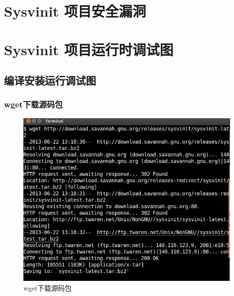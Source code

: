 \chapter{Sysvinit 项目安全漏洞}

\chapter{Sysvinit 项目运行时调试图}

\section{编译安装运行调试图}

\subsection{wget下载源码包}

\begin{figure}[htbp]
\centering
\includegraphics{./pictures/1-1-wget.png}
\caption{wget下载源码包}
\end{figure}

